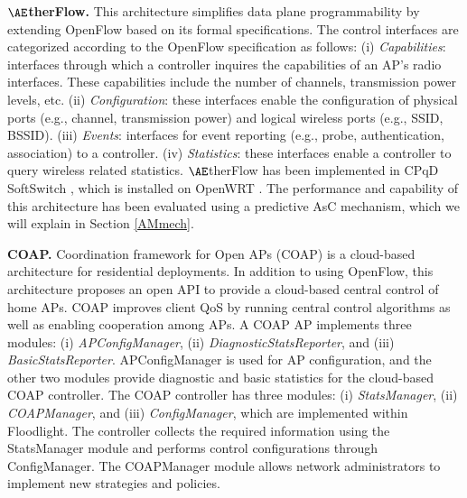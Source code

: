 \textbf{$\AE$therFlow.}
\label{AEtherFlow}
This architecture \cite{AEtherFlow} simplifies data plane programmability by extending OpenFlow based on its formal specifications.
The control interfaces are categorized according to the OpenFlow specification as follows:
(i) \textit{Capabilities}: interfaces through which a controller inquires the capabilities of an AP's radio interfaces. 
These capabilities include the number of channels, transmission power levels, etc.
(ii) \textit{Configuration}: these interfaces enable the configuration of physical ports (e.g., channel, transmission power) and logical wireless ports (e.g., SSID, BSSID).
(iii) \textit{Events}: interfaces for event reporting (e.g., probe, authentication, association) to a controller. 
(iv) \textit{Statistics}: these interfaces enable a controller to query wireless related statistics.
%
$\AE$therFlow has been implemented in CPqD SoftSwitch \cite{ofsoftswitch}, which is installed on OpenWRT \cite{OpenWRT}.
The performance and capability of this architecture has been evaluated using a predictive AsC mechanism, which we will explain in Section \ref{AMmech}.



\textbf{COAP. }
Coordination framework for Open APs (COAP) \cite{COAP} is a cloud-based architecture for residential deployments. 
In addition to using OpenFlow, this architecture proposes an open API to provide a cloud-based central control of home APs. 
COAP improves client QoS by running central control algorithms as well as enabling cooperation among APs.
A COAP AP implements three modules: (i) \textit{APConfigManager}, (ii) \textit{DiagnosticStatsReporter}, and (iii) \textit{BasicStatsReporter}. 
APConfigManager is used for AP configuration, and the other two modules provide diagnostic and basic statistics for the cloud-based COAP controller. 
The COAP controller has three modules: (i) \textit{StatsManager}, (ii) \textit{COAPManager}, and (iii) \textit{ConfigManager}, which are implemented within Floodlight. 
The controller collects the required information using the StatsManager module and performs control configurations through ConfigManager. 
The COAPManager module allows network administrators to implement new strategies and policies. 
%



